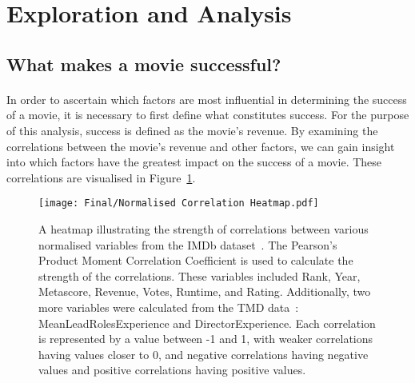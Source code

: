 \section{Exploration and Analysis}
    \subsection{What makes a movie successful?}
        \paragraph{}
            In order to ascertain which factors are most influential in determining the
                success of a movie, it is necessary to first define what constitutes success.
            For the purpose of this analysis, success is defined as the movie's revenue.
            By examining the correlations between the movie's revenue and other factors, we
                can gain insight into which factors have the greatest impact on the success of
                a movie.
            These correlations are visualised in Figure~\ref{fig-heatmap}.

            \begin{figure}[H]
                \centering
                \texttt{[image: Final/Normalised Correlation Heatmap.pdf]}
                \caption[short]{
                    A heatmap illustrating the strength of correlations between various normalised
                    variables from the IMDb dataset~\cite{data:IMDb}.
                    The Pearson's Product Moment Correlation Coefficient is used to calculate the
                        strength of the correlations.
                    These variables included Rank, Year, Metascore, Revenue, Votes, Runtime, and
                        Rating.
                    Additionally, two more variables were calculated from the TMD
                        data~\cite{data:TMD}: MeanLeadRolesExperience and DirectorExperience.
                    Each correlation is represented by a value between -1 and 1, with weaker
                        correlations having values closer to 0, and negative correlations having
                        negative values and positive correlations having positive values.
                }\label{fig-heatmap}
            \end{figure}

